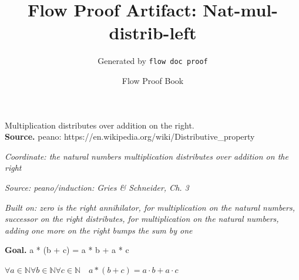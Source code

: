 \documentclass[11pt]{article}
\title{Flow Proof Artifact: Nat-mul-distrib-left}
\author{Generated by \texttt{flow doc proof}}
\date{Flow Proof Book}
\theoremstyle{definition}
\begin{document}
\maketitle
Multiplication distributes over addition on the right.\\[0.5em]
\textbf{Source.} peano: https://en.wikipedia.org/wiki/Distributive\_property\\[0.5em]
\bigskip
{}\par
\smallskip\noindent\textit{Coordinate: the natural numbers \cdot multiplication \cdot distributes over addition on the right}\par
\smallskip\noindent\textit{Source: peano/induction: Gries \& Schneider, Ch. 3}\par
\smallskip\noindent\textit{Built on: zero is the right annihilator, for multiplication on the natural numbers, successor on the right distributes, for multiplication on the natural numbers, adding one more on the right bumps the sum by one}\par
\medskip
\noindent\textbf{Goal.} a * (b + c) = a * b + a * c\par
\noindent$\displaystyle \forall a \in \mathbb{N} \forall b \in \mathbb{N} \forall c \in \mathbb{N}\quad a * (b + c) = a \cdot b + a \cdot c$\par
\medskip
\noindent
\end{document}
